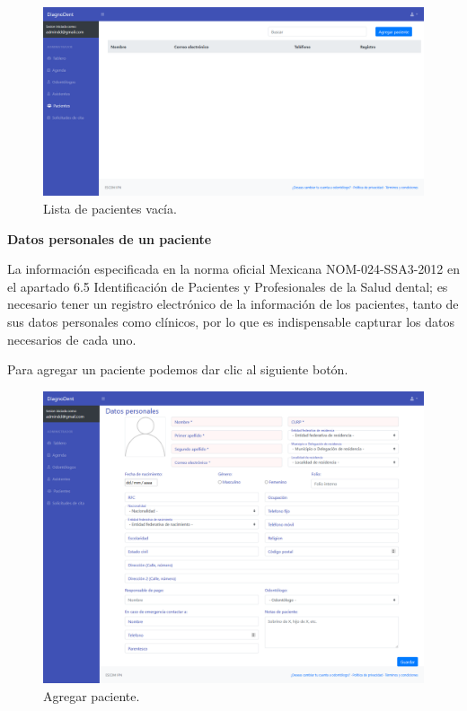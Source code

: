 \begin{figure}[H]
\centering
\includegraphics[width=17cm,keepaspectratio]{pictures/adminodo/pacientes/datos/lista-pacientes-vacia.png}
\caption{Lista de pacientes vacía.}
\end{figure}

\vspace{1em}

{\large \textbf{Datos personales de un paciente}}

\vspace{1em}
La información especificada en la norma oficial Mexicana NOM-024-SSA3-2012 en el apartado 6.5 Identificación de Pacientes y Profesionales de la Salud dental; es necesario tener un registro electrónico de la información de los pacientes, tanto de sus datos personales como clínicos, por lo que es indispensable capturar los datos necesarios de cada uno.

\vspace{1em}
Para agregar un paciente podemos dar clic al siguiente botón.

\begin{figure}[H]
\centering
\includegraphics[width=17cm,keepaspectratio]{pictures/adminodo/pacientes/datos/datos-personales-nuevo-paciente.png}
\caption{Agregar paciente.}
\end{figure}

